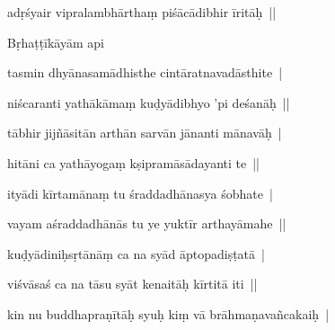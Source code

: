 \documentclass[article,12pt,a4paper]{memoir}%
\newcounter{parCount}
\begin{document}
	  \pstart \leavevmode%
	adṛśyair vipralambhārthaṃ piśācādibhir īritāḥ ||
	{}
	\pend%
      

	  \pstart \leavevmode%
	Bṛhaṭṭīkāyām api 
	{}
	\pend%
      

	  \pstart \leavevmode%
	tasmin dhyānasamādhisthe cintāratnavadāsthite | 
	{}
	\pend%
      

	  \pstart \leavevmode%
	niścaranti yathākāmaṃ kuḍyādibhyo 'pi deśanāḥ || 
	{}
	\pend%
      

	  \pstart \leavevmode%
	tābhir jijñāsitān arthān sarvān jānanti mānavāḥ | 
	{}
	\pend%
      

	  \pstart \leavevmode%
	hitāni ca yathāyogaṃ kṣipramāsādayanti te || 
	{}
	\pend%
      

	  \pstart \leavevmode%
	ityādi kīrtamānaṃ tu śraddadhānasya śobhate | 
	{}
	\pend%
      

	  \pstart \leavevmode%
	vayam aśraddadhānās tu ye yuktīr arthayāmahe || 
	{}
	\pend%
      

	  \pstart \leavevmode%
	kuḍyādiniḥsṛtānāṃ ca na syād āptopadiṣṭatā | 
	{}
	\pend%
      

	  \pstart \leavevmode%
	viśvāsaś ca na tāsu syāt kenaitāḥ kīrtitā iti || 
	{}
	\pend%
      

	  \pstart \leavevmode%
	kin nu buddhapraṇītāḥ syuḥ kiṃ vā brāhmaṇavañcakaiḥ | 
	{}
	\pend%
      
\end{document}
